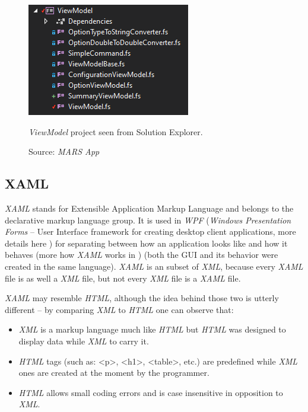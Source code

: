         \begin{figure}[H]
            \centering
            \includegraphics{img/viewmodel.png}
            \caption{\textit{ViewModel} project seen from Solution Explorer.}
            \caption*{Source: \textit{MARS App}}
            \label{fig:viewmodel}
        \end{figure} 
    
\subsection{XAML}
    \textit{XAML} stands for Extensible Application Markup Language and belongs to the declarative markup language group. It is used in \textit{WPF} (\textit{Windows Presentation Forms} -- User Interface framework for creating desktop client applications, more details here \cite{wpf}) for separating between how an application looks like and how it behaves (more how \textit{XAML} works in \cite{how_xaml_works}) (both the GUI and its behavior were created in the same language). \textit{XAML} is an subset of \textit{XML}, because every \textit{XAML} file is as well a \textit{XML} file, but not every \textit{XML} file is a \textit{XAML} file.
    
    \textit{XAML} may resemble \textit{HTML}, although the idea behind those two is utterly different -- by comparing \textit{XML} to \textit{HTML} one can observe that:
    \begin{itemize}
        \item \textit{XML} is a markup language much like \textit{HTML} but \textit{HTML} was designed to display data while \textit{XML} to carry it.
        \item \textit{HTML} tags (such as: <p>, <h1>, <table>, etc.) are predefined while \textit{XML} ones are created at the moment by the programmer.
        \item \textit{HTML} allows small coding errors and is case insensitive in opposition to \textit{XML}.
    \end{itemize}
